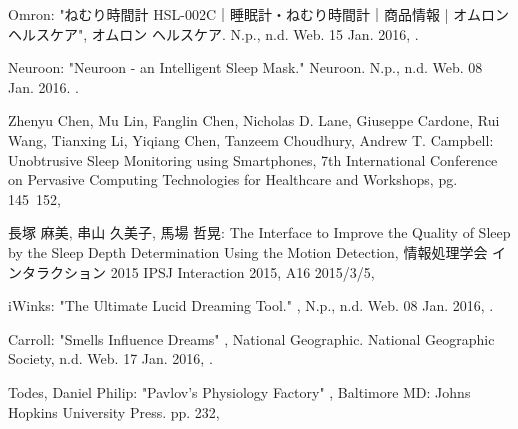 \begin{bib}[100]
\begin{flushleft}
  Omron:
  \newblock  "ねむり時間計 HSL-002C｜睡眠計・ねむり時間計｜商品情報 | オムロン ヘルスケア",
  \newblock オムロン ヘルスケア. N.p., n.d. Web. 15 Jan. 2016,
  .
\end{flushleft}

\begin{flushleft}
  Neuroon:
  \newblock  "Neuroon - an Intelligent Sleep Mask."
  \newblock Neuroon. N.p., n.d. Web. 08 Jan. 2016.
  .
\end{flushleft}

\begin{flushleft}
  Zhenyu Chen, Mu Lin, Fanglin Chen, Nicholas D. Lane, Giuseppe Cardone, Rui Wang, Tianxing Li, Yiqiang Chen, Tanzeem Choudhury, Andrew T. Campbell:
  \newblock  Unobtrusive Sleep Monitoring using Smartphones,
   7th International Conference on Pervasive Computing Technologies for Healthcare and Workshops, pg. 145~152,
\end{flushleft}

\begin{flushleft}
  長塚 麻美, 串山 久美子, 馬場 哲晃:
  \newblock  The Interface to Improve the Quality of Sleep by the Sleep Depth Determination Using the Motion Detection,
  \newblock 情報処理学会 インタラクション 2015 IPSJ Interaction 2015,
  \newblock  A16 2015/3/5,
\end{flushleft}

\begin{flushleft}
iWinks:
 \newblock  "The Ultimate Lucid Dreaming Tool." ,
  \newblock N.p., n.d. Web. 08 Jan. 2016,
  .
\end{flushleft}

\begin{flushleft}
Carroll:
 \newblock  "Smells Influence Dreams" ,
  \newblock National Geographic. National Geographic Society, n.d. Web. 17 Jan. 2016,
  .
\end{flushleft}

\begin{flushleft}
Todes, Daniel Philip:
 \newblock  "Pavlov's Physiology Factory" ,
  \newblock Baltimore MD: Johns Hopkins University Press. pp. 232,
\end{flushleft}

\end{bib}